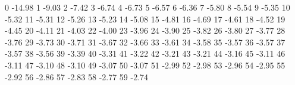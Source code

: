 0 -14.98
1 -9.03
2 -7.42
3 -6.74
4 -6.73
5 -6.57
6 -6.36
7 -5.80
8 -5.54
9 -5.35
10 -5.32
11 -5.31
12 -5.26
13 -5.23
14 -5.08
15 -4.81
16 -4.69
17 -4.61
18 -4.52
19 -4.45
20 -4.11
21 -4.03
22 -4.00
23 -3.96
24 -3.90
25 -3.82
26 -3.80
27 -3.77
28 -3.76
29 -3.73
30 -3.71
31 -3.67
32 -3.66
33 -3.61
34 -3.58
35 -3.57
36 -3.57
37 -3.57
38 -3.56
39 -3.39
40 -3.31
41 -3.22
42 -3.21
43 -3.21
44 -3.16
45 -3.11
46 -3.11
47 -3.10
48 -3.10
49 -3.07
50 -3.07
51 -2.99
52 -2.98
53 -2.96
54 -2.95
55 -2.92
56 -2.86
57 -2.83
58 -2.77
59 -2.74
